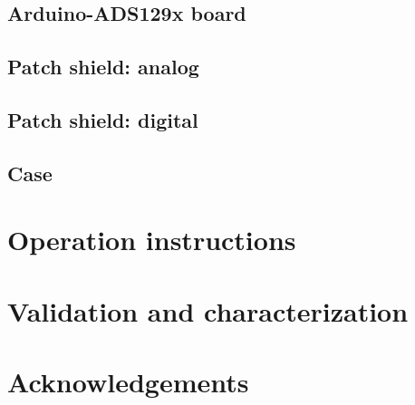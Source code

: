 \documentclass[11pt, letterpaper]{article}
\begin{document}
\subsection{Arduino-ADS129x board}
\subsection{Patch shield: analog}
\subsection{Patch shield: digital}
\subsection{Case}


\section{Operation instructions}

\section{Validation and characterization}

\section{Acknowledgements}
\end{document}
